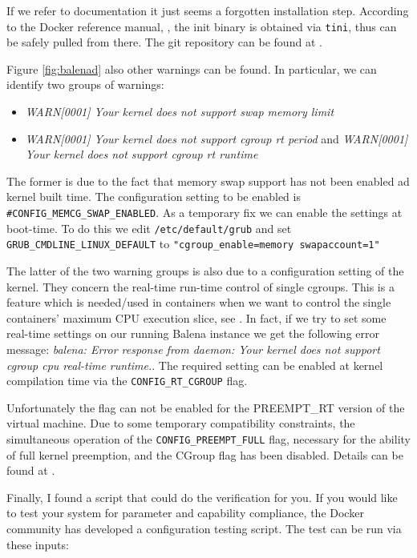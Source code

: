 \documentclass[]{scrartcl}
\begin{document}
If we refer to documentation it just seems a forgotten installation step.
According to the Docker reference manual, \cite{docker03}, the init binary is obtained via \texttt{tini}, thus can be safely pulled from there. The git repository can be found at \cite{tini01}.

Figure \ref{fig:balenad} 
also other warnings can be found. In particular, we can identify two groups of warnings:

\begin{itemize}
	\item \textit{WARN[0001] Your kernel does not support swap memory limit}

	\item \textit{WARN[0001] Your kernel does not support cgroup rt period} and \textit{WARN[0001] Your kernel does not support cgroup rt runtime} 
\end{itemize}

The former is due to the fact that memory swap support has not been enabled ad kernel built time. 
The configuration setting to be enabled is \texttt{\#CONFIG\_MEMCG\_SWAP\_ENABLED}. As a temporary fix we can enable the settings at boot-time. 
To do this we edit \texttt{/etc/default/grub} and set 
\texttt{GRUB\_CMDLINE\_LINUX\_DEFAULT} to \texttt{"cgroup\_enable=memory swapaccount=1"}

The latter of the two warning groups is also due to a configuration setting of the kernel. They concern the real-time run-time control of single cgroups. This is a feature which is needed/used in containers when we want to control the single containers' maximum CPU execution slice, see \cite{docker04}. 
In fact, if we try to set some real-time settings on our running Balena instance we get the following error message: \textit{balena: Error response from daemon: Your kernel does not support cgroup cpu real-time runtime.}.
The required setting can be enabled at kernel compilation time via the \texttt{CONFIG\_RT\_CGROUP} flag. 

Unfortunately the flag can not be enabled for the PREEMPT\_RT version of the virtual machine. Due to some temporary compatibility constraints, the simultaneous operation of the \texttt{CONFIG\_PREEMPT\_FULL} flag, necessary for the ability of full kernel preemption, and the CGroup flag has been disabled. Details can be found at \cite{lfnd01}.

Finally, I found a script that could do the verification for you. If you would like to test your system for parameter and capability compliance, the Docker community has developed a configuration testing script. The test can be run via these inputs:
\end{document}
